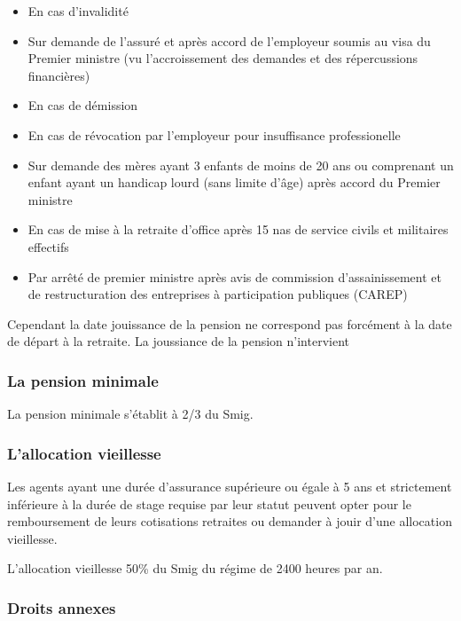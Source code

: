 \documentclass[
  letterpaper,
  DIV=11,
  numbers=noendperiod]{scrreprt}
\begin{document}
\begin{itemize}
\item
  En cas d'invalidité
\item
  Sur demande de l'assuré et après accord de l'employeur soumis au visa
  du Premier ministre (vu l'accroissement des demandes et des
  répercussions financières)
\item
  En cas de démission
\item
  En cas de révocation par l'employeur pour insuffisance professionelle
\item
  Sur demande des mères ayant 3 enfants de moins de 20 ans ou comprenant
  un enfant ayant un handicap lourd (sans limite d'âge) après accord du
  Premier ministre
\item
  En cas de mise à la retraite d'office après 15 nas de service civils
  et militaires effectifs
\item
  Par arrêté de premier ministre après avis de commission
  d'assainissement et de restructuration des entreprises à participation
  publiques (CAREP)
\end{itemize}

Cependant la date jouissance de la pension ne correspond pas forcément à
la date de départ à la retraite. La joussiance de la pension
n'intervient

\subsubsection{La pension minimale}\label{la-pension-minimale}

La pension minimale s'établit à 2/3 du Smig.

\subsubsection{L'allocation vieillesse}\label{lallocation-vieillesse}

Les agents ayant une durée d'assurance supérieure ou égale à 5 ans et
strictement inférieure à la durée de stage requise par leur statut
peuvent opter pour le remboursement de leurs cotisations retraites ou
demander à jouir d'une allocation vieillesse.

L'allocation vieillesse 50\% du Smig du régime de 2400 heures par an.

\subsubsection{Droits annexes}\label{droits-annexes}
\end{document}
